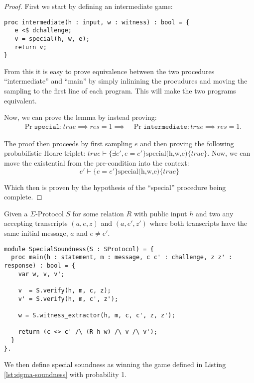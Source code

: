 \begin{proof}
First we start by defining an intermediate game:
\begin{lstlisting}
proc intermediate(h : input, w : witness) : bool = {
   e <$ dchallenge;
   v = special(h, w, e);
   return v;
}
\end{lstlisting}

From this it is easy to prove equivalence between the two procedures
``intermediate'' and ``main'' by simply inlinining the procudures and moving
the sampling to the first line of each program. This will make the two programs
equivalent.

Now, we can prove the lemma by instead proving:
\begin{align*}
  &\Pr{\texttt{special} : true \implies res} = 1 \implies
    &\Pr{\texttt{intermediate} : true \implies res} = 1.
\end{align*}

The proof then proceeds by first sampling $e$ and then proving the following
probabilistic Hoare triplet: $true \vdash \{\exists e', e = e'\}
\text{special(h,w,e)} \{true\}$. Now, we can move the existential
from the pre-condition into the context:
\[
  e' \vdash \{e = e'\} \text{special(h,w,e)} \{true\}
\]

Which then is proven by the hypothesis of the ``special'' procedure being complete.
\end{proof}


\begin{definition}
\label{def:sigma:soundness}
Given a $\Sigma$-Protocol $S$ for some relation $R$ with public input $h$
and two any accepting transcripts $(a,e,z)$ and $(a,e',z')$
where both transcripts have the same initial message, $a$ and $e \neq e'$.

\begin{lstlisting}[float, label=lst:sigma-soundness, caption= 2-special soundness game]
module SpecialSoundness(S : SProtocol) = {
  proc main(h : statement, m : message, c c' : challenge, z z' : response) : bool = {
    var w, v, v';

    v  = S.verify(h, m, c, z);
    v' = S.verify(h, m, c', z');

    w = S.witness_extractor(h, m, c, c', z, z');

    return (c <> c' /\ (R h w) /\ v /\ v');
  }
}.
\end{lstlisting}

We then define special soundness as winning the game
defined in Listing \ref{lst:sigma-soundness} with probability 1.

\end{definition}

